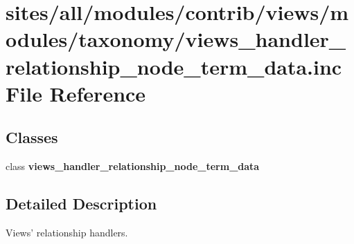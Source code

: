 \hypertarget{views__handler__relationship__node__term__data_8inc}{
\section{sites/all/modules/contrib/views/modules/taxonomy/views\_\-handler\_\-relationship\_\-node\_\-term\_\-data.inc File Reference}
\label{views__handler__relationship__node__term__data_8inc}
}
\subsection*{Classes}
\begin{CompactItemize}
\item 
class \textbf{views\_\-handler\_\-relationship\_\-node\_\-term\_\-data}
\end{CompactItemize}


\subsection{Detailed Description}
Views' relationship handlers. 